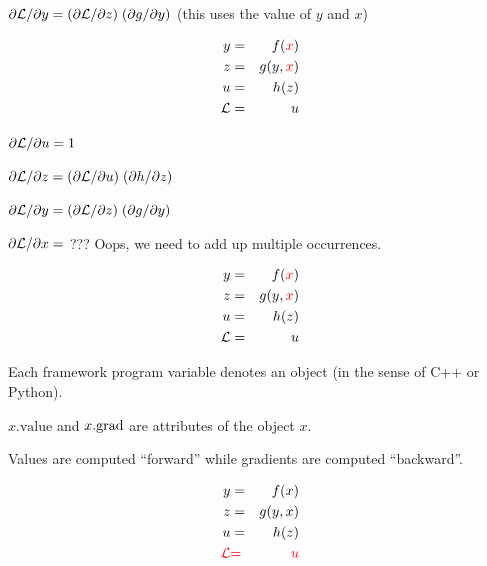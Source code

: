 {\medskip
{\color{red} ${\partial {\cal L}}/{\partial y} = ({\partial {\cal L}}/{\partial z})\; ({\partial g}/{\partial y})$} (this uses the value of $y$ and $x$)

\vspace{-3ex}
\begin{eqnarray*}
  y & = & f({\color{red} x}) \\
  z & = & g(y,{\color{red} x}) \\
  u & = & h(z) \\
  {\cal L} &  = &  u
\end{eqnarray*}

\medskip
${\partial {\cal L}}/{\partial u} = 1$

\medskip
${\partial {\cal L}}/{\partial z} = ({\partial {\cal L}}/{\partial u})\; ({\partial h}/{\partial z})$

\medskip
${\partial {\cal L}}/{\partial y} = ({\partial {\cal L}}/{\partial z})\; ({\partial g}/{\partial y})$

\medskip
{\color{red} ${\partial {\cal L}}/{\partial x} =$ ???} Oops, we need to add up multiple occurrences.

\vspace{-3ex}
\begin{eqnarray*}
  y & = & f({\color{red} x}) \\
  z & = & g(y,{\color{red} x}) \\
  u & = & h(z) \\
  {\cal L} &  = &  u
\end{eqnarray*}

\medskip
Each framework program variable denotes an {\color{red} object} (in the sense of C++ or Python).

\medskip
{\color{red} $x.\mathrm{value}$} and {\color{red} $x.\mathrm{grad}$} are attributes of the {\color{red} object $x$}.

\bigskip
Values are computed ``forward'' while gradients are computed ``backward''.


\vspace{-3ex}
\begin{eqnarray*}
  y & = & f(x) \\
  z & = & g(y,x) \\
  u & = & h(z) \\
  {\color{red} {\cal L}} &  {\color{red} =} & {\color{red}  u}
\end{eqnarray*}


}
